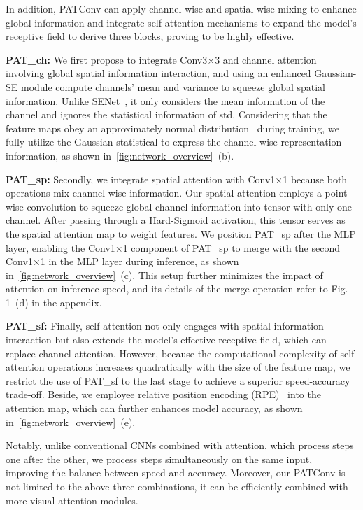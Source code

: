 In addition, PATConv can apply channel-wise and spatial-wise mixing to enhance global information and integrate self-attention mechanisms to expand the model's receptive field to derive three blocks, proving to be highly effective.

\textbf{PAT\_ch:} We first propose to integrate Conv3$\times$3 and channel attention involving global spatial information interaction, and using an enhanced Gaussian-SE module compute channels' mean and variance to squeeze global spatial information. Unlike SENet~\cite{Hu2018}, it only considers the mean information of the channel and ignores the statistical information of std. Considering that the feature maps obey an approximately normal distribution~\cite{ioffe2015batch} during training, we fully utilize the Gaussian statistical to express the channel-wise representation information, as shown in~\cref{fig:network_overview}~(b).

\textbf{PAT\_sp:} Secondly, we integrate spatial attention with Conv1$\times$1 because both operations mix channel wise information. Our spatial attention employs a point-wise convolution to squeeze global channel information into tensor with only one channel. After passing through a Hard-Sigmoid activation, this tensor serves as the spatial attention map to weight features. We position PAT\_sp after the MLP layer, enabling the Conv1$\times$1 component of PAT\_sp to merge with the second Conv1$\times$1 in the MLP layer during inference, as shown in~\cref{fig:network_overview}~(c). This setup further minimizes the impact of attention on inference speed, and its details of the merge operation refer to Fig. 1~(d) in the appendix.

\textbf{PAT\_sf:} Finally, self-attention not only engages with spatial information interaction but also extends the model's effective receptive field, which can replace channel attention. However, because the computational complexity of self-attention operations increases quadratically with the size of the feature map, we restrict the use of PAT\_sf to the last stage to achieve a superior speed-accuracy trade-off. Beside, we employee relative position encoding (RPE)~\cite{Wu2021} into the attention map, which can further enhances model accuracy, as shown in~\cref{fig:network_overview}~(e).

Notably, unlike conventional CNNs combined with attention, which process steps one after the other, we process steps simultaneously on the same input, improving the balance between speed and accuracy. Moreover, our PATConv is not limited to the above three combinations, it can be efficiently combined with more visual attention modules. 

